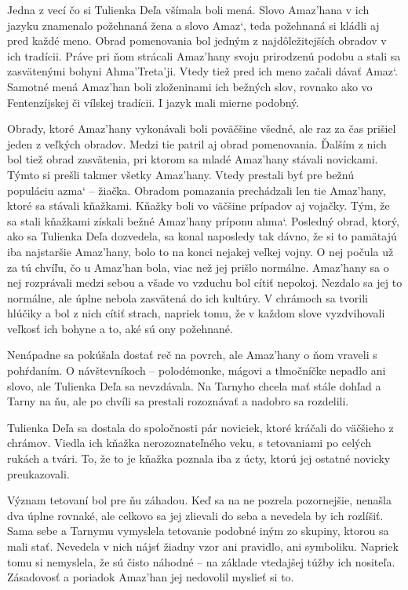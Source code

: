 \documentclass{book}
\begin{document}
Jedna z vecí čo si Tulienka Deľa všímala boli mená. Slovo Amaz'hana v ich jazyku znamenalo požehnaná žena a slovo Amaz‘, teda požehnaná si kládli aj pred každé meno. Obrad pomenovania bol jedným z najdôležitejších obradov v ich tradícii. Práve pri ňom strácali Amaz'hany svoju prirodzenú podobu a stali sa zasvätenými bohyni Ahma'Treta'ji. Vtedy tiež pred ich meno začali dávať Amaz‘. Samotné mená Amaz'han boli zloženinami ich bežných slov, rovnako ako vo Fentenzíjskej či vílskej tradícii. I jazyk mali mierne podobný.

Obrady, ktoré Amaz'hany vykonávali boli poväčšine všedné, ale raz za čas prišiel jeden z veľkých obradov. Medzi tie patril aj obrad pomenovania. Ďalším z nich bol tiež obrad zasvätenia, pri ktorom sa mladé Amaz'hany stávali novickami. Týmto si prešli takmer všetky Amaz'hany. Vtedy prestali byť pre bežnú populáciu azma‘ – žiačka. Obradom pomazania prechádzali len tie Amaz'hany, ktoré sa stávali kňažkami. Kňažky boli vo väčšine prípadov aj vojačky. Tým, že sa stali kňažkami získali bežné Amaz'hany príponu ahma‘. Posledný obrad, ktorý, ako sa Tulienka Deľa dozvedela, sa konal naposledy tak dávno, že si to pamätajú iba najstaršie Amaz'hany, bolo to na konci nejakej veľkej vojny. O nej počula už za tú chvíľu, čo u Amaz'han bola, viac než jej prišlo normálne. Amaz'hany sa o nej rozprávali medzi sebou a všade vo vzduchu bol cítiť nepokoj. Nezdalo sa jej to normálne, ale úplne nebola zasvätená do ich kultúry. V chrámoch sa tvorili hlúčiky a bol z nich cítiť strach, napriek tomu, že v každom slove vyzdvihovali veľkosť ich bohyne a to, aké sú ony požehnané.

Nenápadne sa pokúšala dostať reč na povrch, ale Amaz'hany o ňom vraveli s pohŕdaním. O návštevníkoch – polodémonke, mágovi a tlmočníčke nepadlo ani slovo, ale Tulienka Deľa sa nevzdávala. Na Tarnyho chcela mať stále dohľad a Tarny na ňu, ale po chvíli sa prestali rozoznávať a nadobro sa rozdelili.

Tulienka Deľa sa dostala do spoločnosti pár noviciek, ktoré kráčali do väčšieho z chrámov. Viedla ich kňažka nerozoznateľného veku, s tetovaniami po celých rukách a tvári. To, že to je kňažka poznala iba z úcty, ktorú jej ostatné novicky preukazovali.

Význam tetovaní bol pre ňu záhadou. Keď sa na ne pozrela pozornejšie, nenašla dva úplne rovnaké, ale celkovo sa jej zlievali do seba a nevedela by ich rozlíšiť. Sama sebe a Tarnymu vymyslela tetovanie podobné iným zo skupiny, ktorou sa mali stať. Nevedela v nich nájsť žiadny vzor ani pravidlo, ani symboliku. Napriek tomu si nemyslela, že sú čisto náhodné – na základe vtedajšej túžby ich nositeľa. Zásadovosť a poriadok Amaz'han jej nedovolil myslieť si to.
\end{document}
